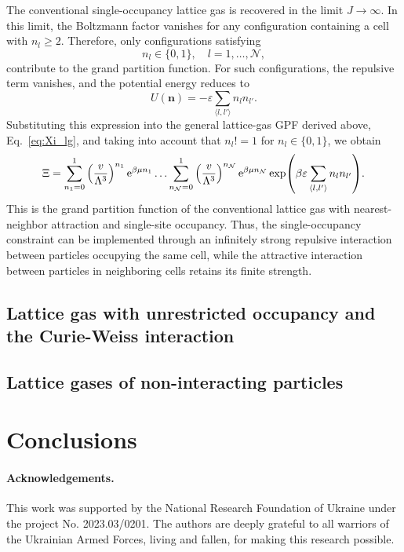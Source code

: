 \documentclass[12pt]{article}
\begin{document}
	The conventional single-occupancy lattice gas is recovered in the limit $J \to \infty$. In this limit, the Boltzmann factor vanishes for any configuration containing a cell with $n_l \geq 2$. Therefore, only configurations satisfying
	\begin{equation}
		n_l \in \{0, 1\}, \quad l = 1, \ldots, \mathcal{N},
	\end{equation}
	contribute to the grand partition function. For such configurations, the repulsive term vanishes, and the potential energy reduces to 
	\begin{equation}
		U(\mathbf{n}) = -\varepsilon \sum_{\langle l, l' \rangle} n_l n_{l'}.
	\end{equation}
	Substituting this expression into the general lattice-gas GPF derived above, Eq.~\eqref{eq:Xi_lg}, and taking into account that $n_l!=1$ for $n_l \in \{0, 1\}$, we obtain
	\begin{equation}
		\Xi = \sum_{n_1 = 0}^1 \left(\frac{v}{\Lambda^3}\right)^{n_1} {\rm e}^{\beta\mu n_1} \ldots \sum_{n_{\mathcal{N}} = 0}^1 \left(\frac{v}{\Lambda^3}\right)^{n_{\mathcal{N}}} {\rm e}^{\beta\mu n_{\mathcal{N}}} \exp({\beta \varepsilon \sum_{\langle l, l' \rangle} n_l n_{l'}}).
	\end{equation}
	This is the grand partition function of the conventional lattice gas with nearest-neighbor attraction and single-site occupancy. Thus, the single-occupancy constraint can be implemented through an infinitely strong repulsive interaction between particles occupying the same cell, while the attractive interaction between particles in neighboring cells retains its finite strength.

	\subsection{Lattice gas with unrestricted occupancy and the Curie-Weiss interaction}
	
	\subsection{Lattice gases of non-interacting particles}
	
	\section{Conclusions}
	
	\paragraph*{Acknowledgements.} This work was supported by the National Research Foundation of Ukraine under the project No. 2023.03/0201. The authors are
	deeply grateful to all warriors of the Ukrainian Armed Forces, living and fallen, for making this research possible.
	
\end{document}
